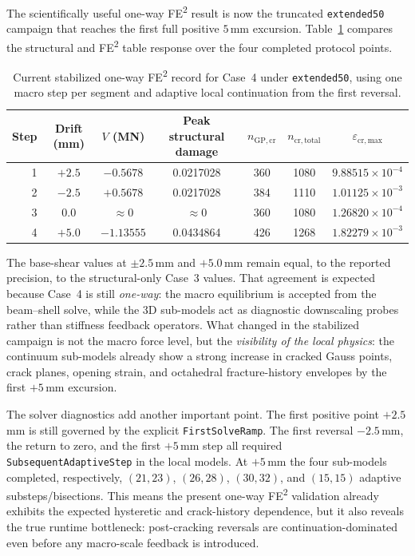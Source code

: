 The scientifically useful one-way FE\textsuperscript{2} result is now the
truncated \texttt{extended50} campaign that reaches the first full positive
\(5\)\,mm excursion.  Table~\ref{tab:case4-current-points} compares the
structural and FE\textsuperscript{2} table response over the four completed
protocol points.

\begin{table}[htbp]
\centering
\caption{Current stabilized one-way FE\textsuperscript{2} record for
  Case~4 under \texttt{extended50}, using one macro step per segment and
  adaptive local continuation from the first reversal.}
\label{tab:case4-current-points}
\begin{tabular}{rcccccc}
\toprule
Step & Drift (mm) & $V$ (MN) & Peak structural damage &
$n_{\mathrm{GP,cr}}$ & $n_{\mathrm{cr,total}}$ & $\varepsilon_{\mathrm{cr,max}}$ \\
\midrule
1 & $+2.5$ & $-0.5678$ & 0.0217028 & 360 & 1080 & $9.88515\times10^{-4}$ \\
2 & $-2.5$ & $+0.5678$ & 0.0217028 & 384 & 1110 & $1.01125\times10^{-3}$ \\
3 & $0.0$  & $\approx 0$ & $\approx 0$ & 360 & 1080 & $1.26820\times10^{-4}$ \\
4 & $+5.0$ & $-1.13555$ & 0.0434864 & 426 & 1268 & $1.82279\times10^{-3}$ \\
\bottomrule
\end{tabular}
\end{table}

The base-shear values at \(\pm 2.5\)\,mm and \(+5.0\)\,mm remain equal, to the
reported precision, to the structural-only Case~3 values.  That agreement is
expected because Case~4 is still \emph{one-way}: the macro equilibrium is
accepted from the beam--shell solve, while the 3D sub-models act as diagnostic
downscaling probes rather than stiffness feedback operators.  What changed in
the stabilized campaign is not the macro force level, but the
\emph{visibility of the local physics}: the continuum sub-models already show a
strong increase in cracked Gauss points, crack planes, opening strain, and
octahedral fracture-history envelopes by the first \(+5\)\,mm excursion.

The solver diagnostics add another important point.  The first positive point
\(+2.5\)\,mm is still governed by the explicit \texttt{FirstSolveRamp}.  The
first reversal \(-2.5\)\,mm, the return to zero, and the first \(+5\)\,mm step
all required \texttt{SubsequentAdaptiveStep} in the local models.  At
\(+5\)\,mm the four sub-models completed, respectively,
\((21,23)\), \((26,28)\), \((30,32)\), and \((15,15)\) adaptive
substeps/bisections.  This means the present one-way FE\textsuperscript{2}
validation already exhibits the expected hysteretic and crack-history
dependence, but it also reveals the true runtime bottleneck:
post-cracking reversals are continuation-dominated even before any macro-scale
feedback is introduced.

